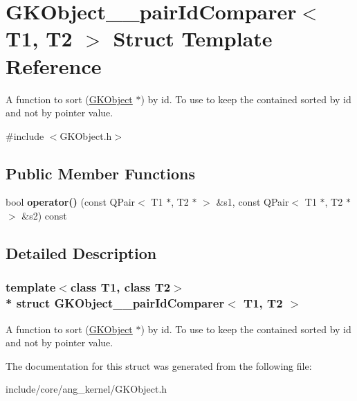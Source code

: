 \hypertarget{structGKObject____pairIdComparer}{}\section{G\+K\+Object\+\_\+\+\_\+pair\+Id\+Comparer$<$ T1, T2 $>$ Struct Template Reference}
\label{structGKObject____pairIdComparer}


A function to sort (\hyperlink{classGKObject}{G\+K\+Object} $\ast$) by id. To use to keep the contained sorted by id and not by pointer value.  




{\ttfamily \#include $<$G\+K\+Object.\+h$>$}

\subsection*{Public Member Functions}
\begin{DoxyCompactItemize}
\item 
bool {\bfseries operator()} (const Q\+Pair$<$ T1 $\ast$, T2 $\ast$ $>$ \&s1, const Q\+Pair$<$ T1 $\ast$, T2 $\ast$ $>$ \&s2) const \hypertarget{structGKObject____pairIdComparer_a5e5ad119c5a90e6b8e3d714dfa45d498}{}\label{structGKObject____pairIdComparer_a5e5ad119c5a90e6b8e3d714dfa45d498}

\end{DoxyCompactItemize}


\subsection{Detailed Description}
\subsubsection*{template$<$class T1, class T2$>$\\*
struct G\+K\+Object\+\_\+\+\_\+pair\+Id\+Comparer$<$ T1, T2 $>$}

A function to sort (\hyperlink{classGKObject}{G\+K\+Object} $\ast$) by id. To use to keep the contained sorted by id and not by pointer value. 

The documentation for this struct was generated from the following file\+:\begin{DoxyCompactItemize}
\item 
include/core/ang\+\_\+kernel/G\+K\+Object.\+h\end{DoxyCompactItemize}
